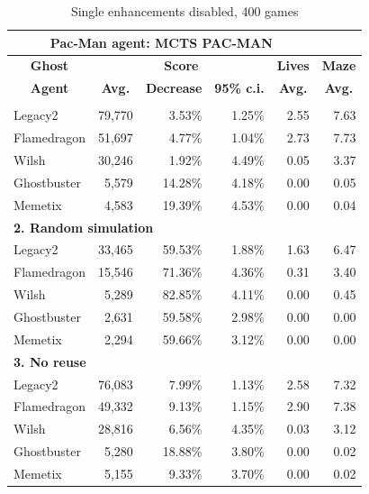 \documentclass[journal]{IEEEtran}
\begin{document}
\begin{table}[hbp]
  \centering
  \caption{Single enhancements disabled, 400 games}
    \begin{tabular}{lrrrrr}
    \toprule
    \multicolumn{5}{c}{\textbf{Pac-Man agent: MCTS PAC-MAN}} \\
    \midrule
\multicolumn{1}{c}{\textbf{Ghost}} & \multicolumn{3}{c}{\textbf{Score}} & \multicolumn{1}{c}{\textbf{Lives}} & \multicolumn{1}{c}{\textbf{Maze}} \\
    \multicolumn{1}{c}{\textbf{Agent}} & \multicolumn{1}{c}{\textbf{Avg.}} & \multicolumn{1}{c}{\textbf{Decrease}} & \multicolumn{1}{c}{\textbf{95\% c.i.}} & \multicolumn{1}{c}{\textbf{Avg.}} & \multicolumn{1}{c}{\textbf{Avg.}}
 \\ \noalign{\smallskip}
    \multicolumn{6}{l}{\textbf{1. Fixed depth}} \\
    {\sc Legacy2 } & 79,770 & 3.53\% & 1.25\% & 2.55  & 7.63 \\
    {\sc Flamedragon } & 51,697 & 4.77\% & 1.04\% & 2.73  & 7.73 \\
    {\sc Wilsh} & 30,246 & 1.92\% & 4.49\% & 0.05  & 3.37 \\
    {\sc Ghostbuster } & 5,579 & 14.28\% & 4.18\% & 0.00  & 0.05 \\
    {\sc Memetix } & 4,583 & 19.39\% & 4.53\% & 0.00  & 0.04 \\
    \multicolumn{6}{l}{\textbf{2. Random simulation}} \\
    {\sc Legacy2 } & 33,465 & 59.53\% & 1.88\% & 1.63  & 6.47 \\
    {\sc Flamedragon } & 15,546 & 71.36\% & 4.36\% & 0.31  & 3.40 \\
    {\sc Wilsh } & 5,289 & 82.85\% & 4.11\% & 0.00  & 0.45 \\
    {\sc Ghostbuster } & 2,631 & 59.58\% & 2.98\% & 0.00  & 0.00 \\
    {\sc Memetix } & 2,294 & 59.66\% & 3.12\% & 0.00  & 0.00 \\
    \multicolumn{6}{l}{\textbf{3. No reuse}} \\
    {\sc Legacy2 } & 76,083 & 7.99\% & 1.13\% & 2.58  & 7.32 \\
    {\sc Flamedragon } & 49,332 & 9.13\% & 1.15\% & 2.90  & 7.38 \\
    {\sc Wilsh } & 28,816 & 6.56\% & 4.35\% & 0.03  & 3.12 \\
    {\sc Ghostbuster } & 5,280 & 18.88\% & 3.80\% & 0.00  & 0.02 \\
    {\sc Memetix } & 5,155 & 9.33\% & 3.70\% & 0.00  & 0.02 \\

\end{tabular}
\end{table}
\end{document}
